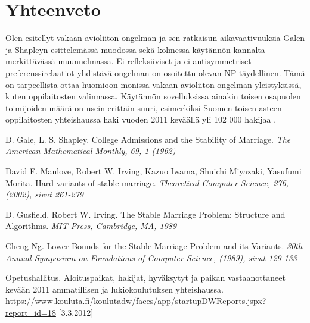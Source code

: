 \documentclass[gradu, twoside]{tktltiki}
\begin{document}
\section{Yhteenveto}

Olen esitellyt vakaan avioliiton ongelman ja sen ratkaisun
aikavaativuuksia Galen ja Shapleyn esittelemässä muodossa sekä
kolmessa käytännön kannalta merkittävässä muunnelmassa.
Ei-refleksiiviset ja ei-antisymmetriset preferenssirelaatiot yhdistävä
ongelman on osoitettu olevan NP-täydellinen. Tämä on tarpeellista
ottaa huomioon monissa vakaan avioliiton ongelman yleistyksissä, kuten
oppilaitosten valinnassa. Käytännön sovelluksissa ainakin toisen
osapuolen toimijoiden määrä on usein erittäin suuri, esimerkiksi
Suomen toisen asteen oppilaitosten yhteishaussa haki vuoden 2011
keväällä yli 102 000 hakijaa \cite{OPH12}.

\begin{thebibliography}{XXX99}

  D. Gale, L. S. Shapley.
  College Admissions and the Stability of Marriage.
  \emph{The American Mathematical Monthly, 69, 1 (1962)}

  David F. Manlove, Robert W. Irving, Kazuo Iwama, Shuichi Miyazaki,
  Yasufumi Morita.
  Hard variants of stable marriage.
  \emph{Theoretical Computer Science, 276, (2002), sivut 261-279}

  D. Gusfield, Robert W. Irving.
  The Stable Marriage Problem: Structure and Algorithms.
  \emph{MIT Press, Cambridge, MA, 1989}

  Cheng Ng.
  Lower Bounds for the Stable Marriage Problem and its Variants.
  \emph{30th Annual Symposium on Foundations of Computer Science,
    (1989), sivut 129-133}

  Opetushallitus.
  Aloituspaikat, hakijat, hyväksytyt ja paikan vastaanottaneet kevään
  2011 ammatillisen ja lukiokoulutuksen yhteishaussa.
  \url{https://www.kouluta.fi/koulutadw/faces/app/startupDWReports.jspx?report_id=18}
      [3.3.2012]

\end{thebibliography}
\end{document}
